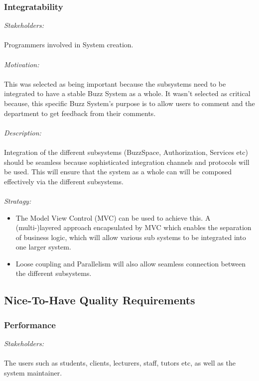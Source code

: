 \documentclass[a4paper,12pt]{report}
\begin{document}
			
		\subsubsection{Integratability}
		\emph{Stakeholders: }\\\\ Programmers involved in System creation.\\\\
		\emph{Motivation: }\\\\ This was selected as being important because the subsystems need to be integrated to have a stable Buzz System as a whole. It wasn’t selected as critical because, this specific Buzz System's purpose is to allow users to comment and the department to get feedback from their comments.\\\\
		\emph{Description: }\\\\Integration of the different subsystems (BuzzSpace, Authorization, Services etc) should be seamless because sophisticated integration channels and protocols will be used. This will ensure that the system as a whole can will be composed effectively via the different subsystems. \\\\
		\emph{Stratagy: }
		\begin {itemize}
		\item The Model View Control (MVC) can be used to achieve this. A (multi-)layered approach encapsulated by MVC which enables the separation of business logic, which will allow various sub systems to be integrated into one larger system.
		\item Loose coupling and Parallelism will also allow seamless connection between the different subsystems. 
		\end {itemize}
		
		
	\subsection{Nice-To-Have Quality Requirements}
		\subsubsection{Performance}
		\emph{Stakeholders: }\\\\ The users such as students, clients, lecturers, staff, tutors etc, as well as the system maintainer.\\\\
		
\end{document}
